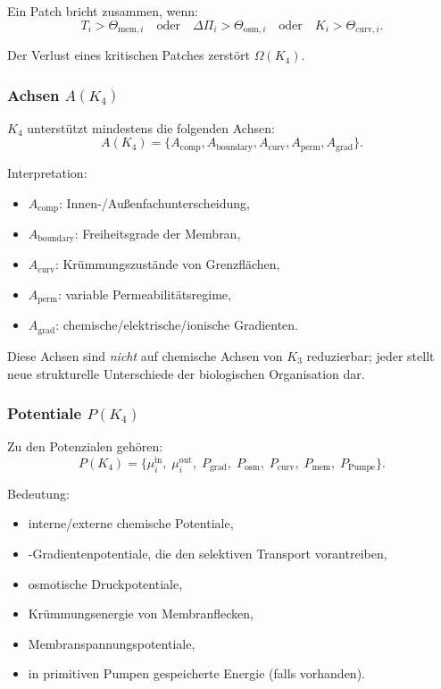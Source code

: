 Ein Patch bricht zusammen, wenn:
\[
T_i > \Theta_{\mathrm{mem},i}
\quad \text{oder} \quad
\Delta \Pi_i > \Theta_{\mathrm{osm},i}
\quad \text{oder} \quad
K_i > \Theta_{\mathrm{curv},i}.
\]

Der Verlust eines kritischen Patches zerstört $\Omega(K_4)$.

\subsubsection{Achsen \texorpdfstring{$A(K_4)$}{A(K_4)}}

$K_4$ unterstützt mindestens die folgenden Achsen:
\[
A(K_4) = \{ A_{\mathrm{comp}}, A_{\mathrm{boundary}},
           A_{\mathrm{curv}}, A_{\mathrm{perm}}, A_{\mathrm{grad}}\}.
\]

Interpretation:
\begin{itemize}
    \item $A_{\mathrm{comp}}$: Innen-/Außenfachunterscheidung,
    \item $A_{\mathrm{boundary}}$: Freiheitsgrade der Membran,
    \item $A_{\mathrm{curv}}$: Krümmungszustände von Grenzflächen,
    \item $A_{\mathrm{perm}}$: variable Permeabilitätsregime,
    \item $A_{\mathrm{grad}}$: chemische/elektrische/ionische Gradienten.
\end{itemize}

Diese Achsen sind \emph{nicht} auf chemische Achsen von $K_3$ reduzierbar; jeder
stellt neue strukturelle Unterschiede der biologischen Organisation dar.

\subsubsection{Potentiale \texorpdfstring{$P(K_4)$}{P(K_4)}}

Zu den Potenzialen gehören:
\[
P(K_4) =
\{ \mu_i^{\mathrm{in}},\; \mu_i^{\mathrm{out}},\;
   P_{\mathrm{grad}},\;
   P_{\mathrm{osm}},\;
   P_{\mathrm{curv}},\;
   P_{\mathrm{mem}},\;
   P_{\mathrm{Pumpe}} \}.
\]

Bedeutung:
\begin{itemize}
    \item interne/externe chemische Potentiale,
    \item-Gradientenpotentiale, die den selektiven Transport vorantreiben,
    \item osmotische Druckpotentiale,
    \item Krümmungsenergie von Membranflecken,
    \item Membranspannungspotentiale,
    \item in primitiven Pumpen gespeicherte Energie (falls vorhanden).
\end{itemize}

